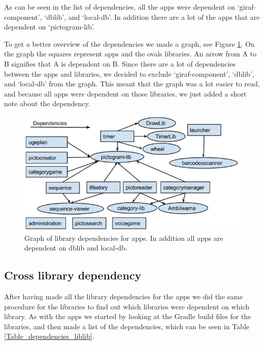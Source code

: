As can be seen in the list of dependencies, all the apps were dependent on ‘giraf-component’, ‘dblib’, and ‘local-db’. In addition there are a lot of the apps that are dependent on ‘pictogram-lib’.

To get a better overview of the dependencies we made a graph, see Figure \ref{AppLibependencies}. On the graph the squares represent apps and the ovals libraries. An arrow from A to B signifies that A is dependent on B. Since there are a lot of dependencies between the apps and libraries, we decided to exclude ‘giraf-component’, ‘dblib’, and ‘local-db’ from the graph. This meant that the graph was a lot easier to read, and because all apps were dependent on those libraries, we just added a short note about the dependency.


\begin{figure}[H]
	\centering
	\includegraphics[width=0.8 \textwidth]{pictures/AppLibependencies.png}
	\caption{Graph of library dependencies for apps. In addition all apps are dependent on dblib and local-db.}
	\label{AppLibependencies}
\end{figure}


\subsection{Cross library dependency}
After having made all the library dependencies for the apps we did the same procedure for the libraries to find out which libraries were dependent on which library. As with the apps we started by looking at the Gradle build files for the libraries, and then made a list of the dependencies, which can be seen in Table \ref{Table_dependencies_liblib}.


